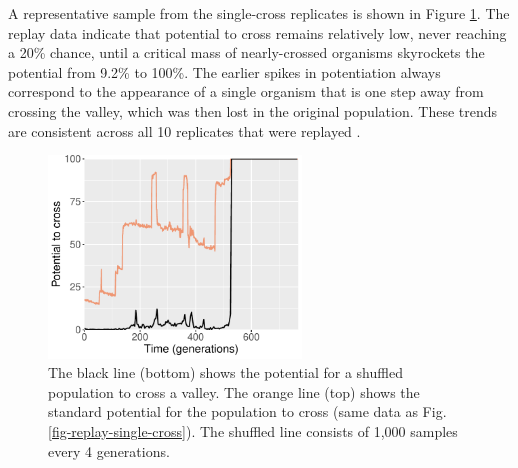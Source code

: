 A representative sample from the single-cross replicates is shown in Figure \ref{fig-replay-shuffle}. 
The replay data indicate that potential to cross remains relatively low, never reaching a 20\% chance, until a critical mass of nearly-crossed organisms skyrockets the potential from 9.2\% to 100\%. 
The earlier spikes in potentiation always correspond to the appearance of a single organism that is one step away from crossing the valley, which was then lost in the original population.
These trends are consistent across all 10 replicates that were replayed \citep{austin_ferguson_2024_11507982}. 

\begin{figure}[h!]
\begin{center}
\includegraphics[width=0.6\textwidth]{05_adaptive_momentum/media/reps/400/script_07__plot_01__selected_replays_with_shuffled_replays_no_bg.pdf}
\caption{
    The black line (bottom) shows the potential for a shuffled population to cross a valley. 
    The orange line (top) shows the standard potential for the population to cross (same data as Fig. \ref{fig-replay-single-cross}). 
    The shuffled line consists of 1,000 samples every 4 generations. 
}
\label{fig-replay-shuffle}
\end{center}
\end{figure}










